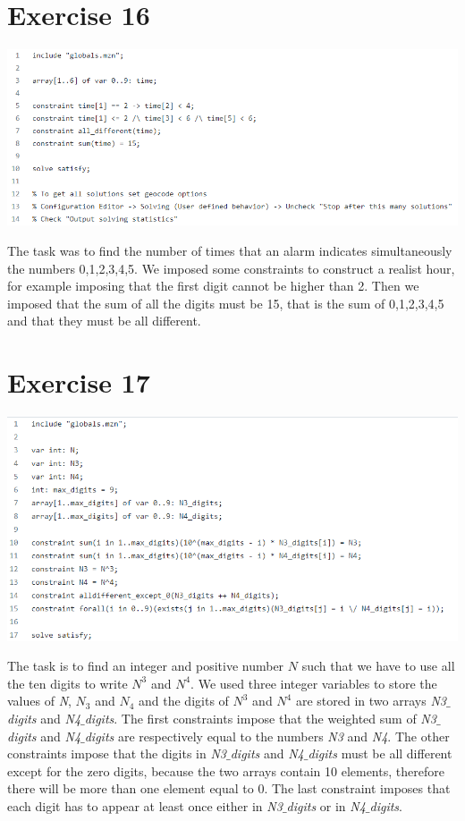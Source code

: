\documentclass{article}
\begin{document}
\section{Exercise 16}
\vspace{0.2cm}
\includegraphics[width=\linewidth]{img/Es16.png}
\vspace{0.2cm}

The task was to find the number of times that an alarm indicates simultaneously the numbers 0,1,2,3,4,5. We imposed some constraints to construct a realist hour, for example imposing that the first digit cannot be higher than 2. Then we imposed that the sum of all the digits must be 15, that is the sum of  0,1,2,3,4,5 and that they must be all different.

\section{Exercise 17}
\vspace{0.2cm}
\includegraphics[width=\linewidth]{img/Es17.png}
\vspace{0.2cm}

The task is to find an integer and positive number $N$ such that we have to use all the ten digits to write $N^3$ and $N^4$. 
We used three integer variables to store the values of \textit{N}, \textit{$N_3$} and \textit{$N_4$}
and the digits of $N^3$ and $N^4$ are stored in two arrays \textit{N3$\_$digits} and \textit{N4$\_$digits}. The first constraints impose that the weighted sum of \textit{N3$\_$digits} and \textit{N4$\_$digits} are respectively equal to the numbers \textit{N3} and \textit{N4}. The other constraints impose that the digits in \textit{N3$\_$digits} and \textit{N4$\_$digits} must be all different except for the zero digits, because the two arrays contain 10 elements, therefore there will be more than one element equal to 0. The last constraint imposes that each digit has to appear at least once either in \textit{N3$\_$digits} or in \textit{N4$\_$digits}.
\end{document}

